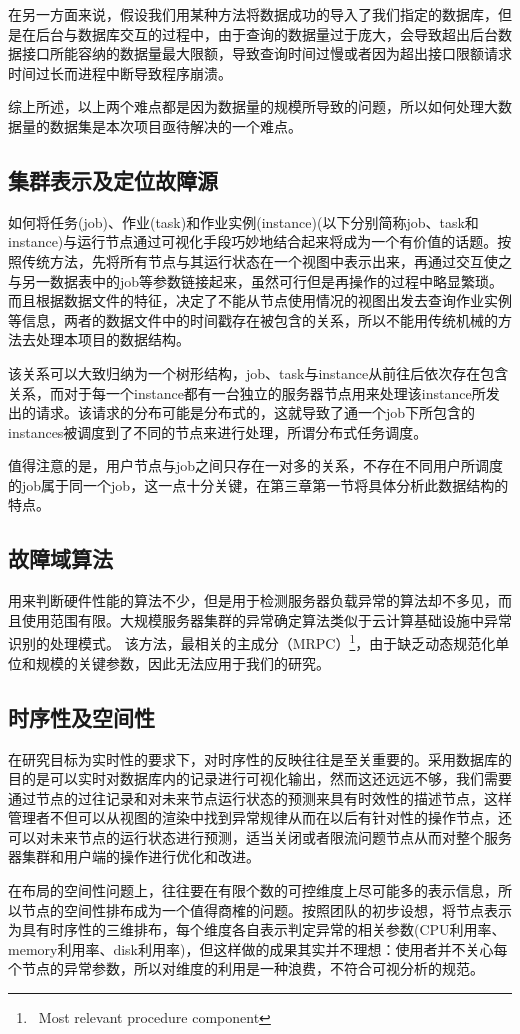 在另一方面来说，假设我们用某种方法将数据成功的导入了我们指定的数据库，但是在后台与数据库交互的过程中，由于查询的数据量过于庞大，会导致超出后台数据接口所能容纳的数据量最大限额，导致查询时间过慢或者因为超出接口限额请求时间过长而进程中断导致程序崩溃。

综上所述，以上两个难点都是因为数据量的规模所导致的问题，所以如何处理大数据量的数据集是本次项目亟待解决的一个难点。
\subsection{集群表示及定位故障源}
如何将任务(job)、作业(task)和作业实例(instance)(以下分别简称job、task和instance)与运行节点通过可视化手段巧妙地结合起来将成为一个有价值的话题。按照传统方法，先将所有节点与其运行状态在一个视图中表示出来，再通过交互使之与另一数据表中的job等参数链接起来，虽然可行但是再操作的过程中略显繁琐。而且根据数据文件的特征，决定了不能从节点使用情况的视图出发去查询作业实例等信息，两者的数据文件中的时间戳存在被包含的关系，所以不能用传统机械的方法去处理本项目的数据结构。

该关系可以大致归纳为一个树形结构，job、task与instance从前往后依次存在包含关系，而对于每一个instance都有一台独立的服务器节点用来处理该instance所发出的请求。该请求的分布可能是分布式的，这就导致了通一个job下所包含的instances被调度到了不同的节点来进行处理，所谓分布式任务调度。

值得注意的是，用户节点与job之间只存在一对多的关系，不存在不同用户所调度的job属于同一个job，这一点十分关键，在第三章第一节将具体分析此数据结构的特点。
\subsection{故障域算法}
用来判断硬件性能的算法不少，但是用于检测服务器负载异常的算法却不多见，而且使用范围有限。大规模服务器集群的异常确定算法类似于云计算基础设施中异常识别的处理模式。 该方法，最相关的主成分（MRPC）\footnote{\ Most relevant procedure component}，由于缺乏动态规范化单位和规模的关键参数，因此无法应用于我们的研究。 
\subsection{时序性及空间性}
在研究目标为实时性的要求下，对时序性的反映往往是至关重要的。采用数据库的目的是可以实时对数据库内的记录进行可视化输出，然而这还远远不够，我们需要通过节点的过往记录和对未来节点运行状态的预测来具有时效性的描述节点，这样管理者不但可以从视图的渲染中找到异常规律从而在以后有针对性的操作节点，还可以对未来节点的运行状态进行预测，适当关闭或者限流问题节点从而对整个服务器集群和用户端的操作进行优化和改进。

在布局的空间性问题上，往往要在有限个数的可控维度上尽可能多的表示信息，所以节点的空间性排布成为一个值得商榷的问题。按照团队的初步设想，将节点表示为具有时序性的三维排布，每个维度各自表示判定异常的相关参数(CPU利用率、memory利用率、disk利用率)，但这样做的成果其实并不理想：使用者并不关心每个节点的异常参数，所以对维度的利用是一种浪费，不符合可视分析的规范。